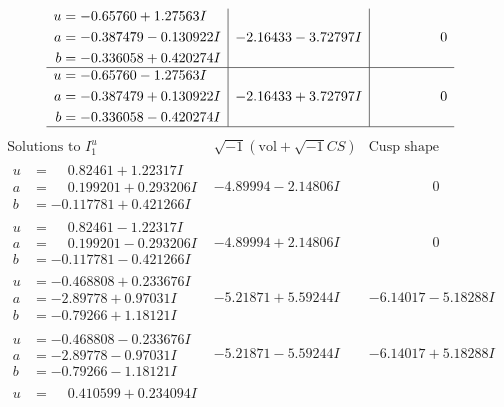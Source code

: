 \documentclass[1p]{elsarticle_modified}
\theoremstyle{definition}
\newcommand{\I}{\sqrt{-1}}
\begin{document}
$$\begin{array}{c|c|c}
\begin{aligned}
u &= -0.65760 + 1.27563 I \\
a &= -0.387479 - 0.130922 I \\
b &= -0.336058 + 0.420274 I\end{aligned}
 & -2.16433 - 3.72797 I & \phantom{-0.000000 } 0 \\ \hline\begin{aligned}
u &= -0.65760 - 1.27563 I \\
a &= -0.387479 + 0.130922 I \\
b &= -0.336058 - 0.420274 I\end{aligned}
 & -2.16433 + 3.72797 I & \phantom{-0.000000 } 0\\
 \hline 
 \end{array}$$\newpage$$\begin{array}{c|c|c}  
\text{Solutions to }I^u_{1}& \I (\text{vol} + \sqrt{-1}CS) & \text{Cusp shape}\\
 \hline 
\begin{aligned}
u &= \phantom{-}0.82461 + 1.22317 I \\
a &= \phantom{-}0.199201 + 0.293206 I \\
b &= -0.117781 + 0.421266 I\end{aligned}
 & -4.89994 - 2.14806 I & \phantom{-0.000000 } 0 \\ \hline\begin{aligned}
u &= \phantom{-}0.82461 - 1.22317 I \\
a &= \phantom{-}0.199201 - 0.293206 I \\
b &= -0.117781 - 0.421266 I\end{aligned}
 & -4.89994 + 2.14806 I & \phantom{-0.000000 } 0 \\ \hline\begin{aligned}
u &= -0.468808 + 0.233676 I \\
a &= -2.89778 + 0.97031 I \\
b &= -0.79266 + 1.18121 I\end{aligned}
 & -5.21871 + 5.59244 I & -6.14017 - 5.18288 I \\ \hline\begin{aligned}
u &= -0.468808 - 0.233676 I \\
a &= -2.89778 - 0.97031 I \\
b &= -0.79266 - 1.18121 I\end{aligned}
 & -5.21871 - 5.59244 I & -6.14017 + 5.18288 I \\ \hline\begin{aligned}
u &= \phantom{-}0.410599 + 0.234094 I \\

\end{aligned}
\end{array}$$
\end{document}
